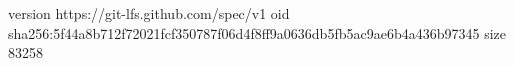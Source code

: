 version https://git-lfs.github.com/spec/v1
oid sha256:5f44a8b712f72021fcf350787f06d4f8ff9a0636db5fb5ac9ae6b4a436b97345
size 83258
